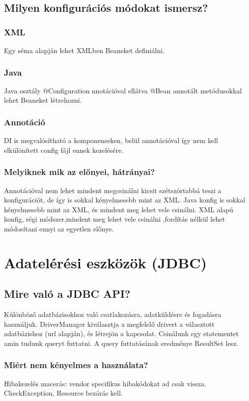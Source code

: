 \documentclass[a4paper,14pt]{extarticle}
\begin{document}
		\subsection{Milyen konfigurációs módokat ismersz?}
			\subsubsection{XML}
			Egy séma alapján lehet XMLben Beaneket definiálni.
			\subsubsection{Java}
			Java osztály @Configuration nnotációval ellátva @Bean annotált metódusokkal lehet Beaneket létrehozni.
			\subsubsection{Annotáció}
			DI is megvalósítható a komponenseken, belül annotációval így nem kell elkülönített config fájl ennek kezelésére.
			\subsubsection{Melyiknek mik az előnyei, hátrányai?}
			Annotációval nem lehet mindent megcsinálni kicsit szétszórtabbá teszi a konfigurációt, de így is sokkal kényelmesebb mint az XML. Java konfig is sokkal kényelmesebb mint az XML, és mindent meg lehet vele csinálni. XML alapú konfig, régi módszer,mindent meg lehet vele csinálni ,fordítás nélkül lehet módosítani ennyi az egyetlen előnye.
			
	\section{Adatelérési eszközök (JDBC)}
		\subsection{Mire való a JDBC API?}
			Különböző adatbázisokhoz való csatlakozásra, adatküldésre és fogadásra használjuk. DriverManager kiválasztja a megfelelő drivert a választott adatbázishoz (url alapján), és létrejön a kapcsolat.
			Csinálunk egy statementet amin tudunk queryt futtatni.
			A query futtatásának eredménye ResultSet lesz.
			\subsubsection{Miért nem kényelmes a használata?}
			Hibakezelés macerás: vendor specifikus hibakódokat ad csak vissza.
			CheckException, Resource bezárás kell.
\end{document}
